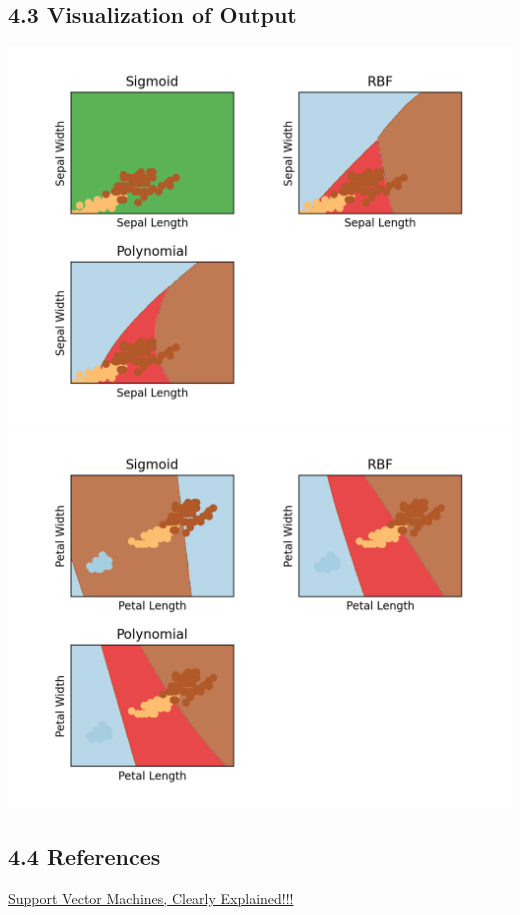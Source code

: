 \documentclass[12pt]{article}
\begin{document}
\subsection*{4.3 Visualization of Output}
\begin{center}
    \includegraphics[scale=0.8]{fig/ec3.png}
    \includegraphics[scale=0.8]{fig/ec4.png}
\end{center}

\subsection*{4.4 References}
\href{https://www.youtube.com/watch?v=efR1C6CvhmE}{Support Vector Machines, Clearly Explained!!!}
\end{document}
